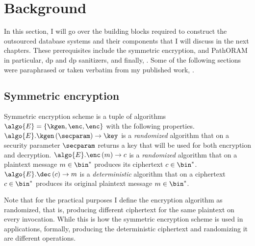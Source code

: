 \chapter{Background}\label{section:background}
\thispagestyle{myheadings}

	In this section, I will go over the building blocks required to construct the outsourced database systems and their components that I will discuss in the next chapters.
	These prerequisites include the symmetric encryption,  and PathORAM \cite{path-oram} in particular, \acrlong{dp} and \acrshort{dp} sanitizers, and finally, .
	Some of the following sections were paraphrased or taken verbatim from my published work, \cite{ore-benchmark-17,epsolute}.

	\section{Symmetric encryption}

		Symmetric encryption scheme is a tuple of algorithms $\algo{E} = \{ \kgen, \enc, \enc \}$ with the following properties.
		$\algo{E}.\kgen \left( \secparam \right) \to \key$ is a \emph{randomized} algorithm that on a security parameter $\secparam$ returns a key that will be used for both encryption and decryption.
		$\algo{E}.\enc \left( m \right) \to c$ is a \emph{randomized} algorithm that on a plaintext message $m \in \bin^*$ produces its ciphertext $c \in \bin^*$.
		$\algo{E}.\dec \left( c \right) \to m$ is a \emph{deterministic} algorithm that on a ciphertext $c \in \bin^*$ produces its original plaintext message $m \in \bin^*$.

		Note that for the practical purposes I define the encryption algorithm as randomized, that is, producing different ciphertext for the same plaintext on every invocation.
		While this is how the symmetric encryption scheme is used in applications, formally, producing the deterministic ciphertext and randomizing it are different operations.

